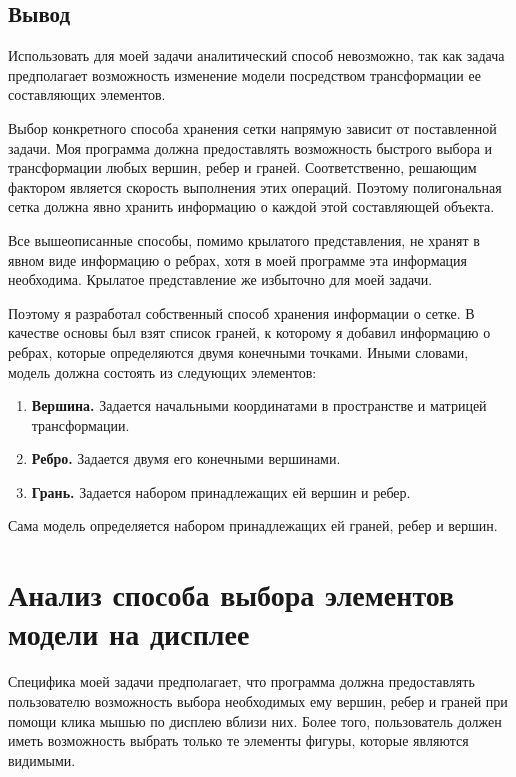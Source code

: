 \subsection*{Вывод}

Использовать для моей задачи аналитический способ невозможно, так как задача предполагает возможность изменение модели посредством трансформации ее составляющих элементов.

Выбор конкретного способа хранения сетки напрямую зависит от поставленной задачи. Моя программа должна предоставлять возможность быстрого выбора и трансформации любых вершин, ребер и граней. Соответственно, решающим фактором является скорость выполнения этих операций. Поэтому полигональная сетка должна явно хранить информацию о каждой этой составляющей объекта. 

Все вышеописанные способы, помимо крылатого представления, не хранят в явном виде информацию о ребрах, хотя в моей программе эта информация необходима. Крылатое представление же избыточно для моей задачи. 

Поэтому я разработал собственный способ хранения информации о сетке. В качестве основы был взят список граней, к которому я добавил информацию о ребрах, которые определяются двумя конечными точками. Иными словами, модель должна состоять из следующих элементов:
\begin{enumerate}
	\item \textbf{Вершина.} Задается начальными координатами в пространстве и матрицей трансформации.
	
	\item \textbf{Ребро.} Задается двумя его конечными вершинами.
	
	\item \textbf{Грань.} Задается набором принадлежащих ей вершин и ребер.
	
\end{enumerate}

Сама модель определяется набором принадлежащих ей граней, ребер и вершин.

\section{Анализ способа выбора элементов модели на дисплее}

Специфика моей задачи предполагает, что программа должна предоставлять пользователю возможность выбора необходимых ему вершин, ребер и граней при помощи клика мышью по дисплею вблизи них. Более того, пользователь должен иметь возможность выбрать только те элементы фигуры, которые являются видимыми. 


